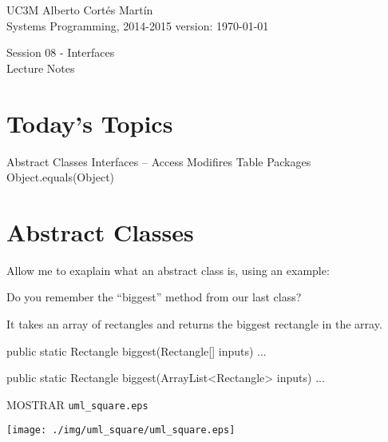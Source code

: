 \documentclass[a4paper, 9pt]{extarticle}
\newcommand{\realtitle}{Session 08 - Interfaces}
\begin{document}
\makebox[\linewidth]{\rule{\textwidth}{0.4pt}}
UC3M \hfill Alberto Cortés Martín\\
Systems Programming, 2014-2015 \hfill version: \today\\
\makebox[\linewidth]{\rule{\textwidth}{0.4pt}}
\begin{center}
  \Large{\realtitle}\\Lecture Notes
\end{center}
\makebox[\linewidth]{\rule{\textwidth}{0.4pt}}
\vspace{1cm}


\section{Today's Topics}
\begin{blackboard}
Abstract Classes
Interfaces
--
Access Modifires Table
Packages
Object.equals(Object)
\end{blackboard}










\section{Abstract Classes}




Allow me to exaplain what an abstract class is, using an example:

Do you remember the ``biggest'' method from our last class?

It takes an array of rectangles and returns the biggest rectangle in the array.

\begin{blackboard}
  public static Rectangle biggest(Rectangle[] inputs) {
    ...
  }

  public static Rectangle biggest(ArrayList<Rectangle> inputs) {
    ...
  }
\end{blackboard}

MOSTRAR \verb+uml_square.eps+
\begin{center}
  \texttt{[image: ./img/uml\_square/uml\_square.eps]}
\end{center}
\end{document}
